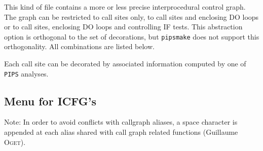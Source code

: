 \documentclass[a4paper]{report}
\newenvironment{PipsPass}[1]{\label{pass:#1}}{}
\newcommand{\Pips}{\texttt{PIPS}}
\newcommand{\Pipsmake}{\texttt{pipsmake}}
\begin{document}
\begin{PipsPass}{icfg_file}
This kind of file contains a more or less precise interprocedural
control graph. The graph can be restricted to call sites only, to call
sites and enclosing DO loops or to call sites, enclosing DO loops and
controlling IF tests. This abstraction option is orthogonal to the set
of decorations, but \Pipsmake{} does not support this
orthogonality. All combinations are listed below.

Each call site can be decorated by associated information computed by one
of \Pips{} analyses.



\end{PipsPass}

\subsection{Menu for ICFG's}

Note: In order to avoid conflicts with callgraph aliases, a space
character is appended at each alias shared with call graph related
functions (Guillaume \textsc{Oget}).
\end{document}
